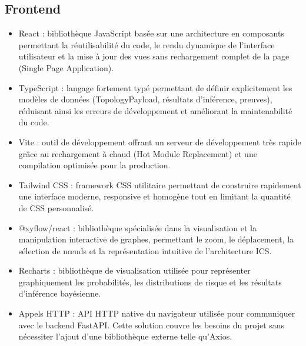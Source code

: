 \documentclass[12pt,a4paper]{article}
\newcommand{\forcereset}[1]{%
    \needspace{#1\baselineskip}%
}
\begin{document}
\subsection{Frontend}
\forcereset{4}
\begin{itemize}[leftmargin=1.2cm, itemsep=0.2\baselineskip]
    \item React : bibliothèque JavaScript basée sur une architecture en composants permettant la réutilisabilité du code, le rendu dynamique de l'interface utilisateur et la mise à jour des vues sans rechargement complet de la page (Single Page Application).
    \item TypeScript : langage fortement typé permettant de définir explicitement les modèles de données (TopologyPayload, résultats d'inférence, preuves), réduisant ainsi les erreurs de développement et améliorant la maintenabilité du code.
    \item Vite : outil de développement offrant un serveur de développement très rapide grâce au rechargement à chaud (Hot Module Replacement) et une compilation optimisée pour la production.
    \item Tailwind CSS : framework CSS utilitaire permettant de construire rapidement une interface moderne, responsive et homogène tout en limitant la quantité de CSS personnalisé.
    \item @xyflow/react : bibliothèque spécialisée dans la visualisation et la manipulation interactive de graphes, permettant le zoom, le déplacement, la sélection de nœuds et la représentation intuitive de l'architecture ICS.
    \item Recharts : bibliothèque de visualisation utilisée pour représenter graphiquement les probabilités, les distributions de risque et les résultats d'inférence bayésienne.
    \item Appels HTTP : API HTTP native du navigateur utilisée pour communiquer avec le backend FastAPI. Cette solution couvre les besoins du projet sans nécessiter l'ajout d'une bibliothèque externe telle qu'Axios.
\end{itemize}

\newpage
\end{document}
